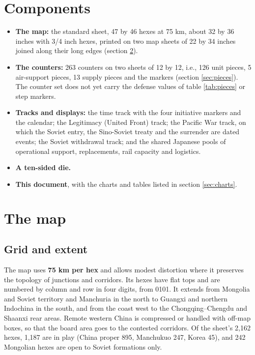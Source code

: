 \documentclass[11pt]{article}
\begin{document}
\section{Components}\label{sec:components}
\begin{itemize}
\item \textbf{The map:} the standard sheet, 47 by 46 hexes at 75 km, about 32 by 36 inches with 3/4 inch hexes, printed on two map sheets of 22 by 34 inches joined along their long edges (section \ref{sec:map}).
\item \textbf{The counters:} 263 counters on two sheets of 12 by 12, i.e., 126 unit pieces, 5 air-support pieces, 13 supply pieces and the markers (section \ref{sec:pieces}). The counter set does not yet carry the defense values of table \ref{tab:pieces} or step markers.
\item \textbf{Tracks and displays:} the time track with the four initiative markers and the calendar; the Legitimacy (United Front) track; the Pacific War track, on which the Soviet entry, the Sino-Soviet treaty and the surrender are dated events; the Soviet withdrawal track; and the shared Japanese pools of operational support, replacements, rail capacity and logistics.\item \textbf{A ten-sided die.}
\item \textbf{This document}, with the charts and tables listed in section \ref{sec:charts}.
\end{itemize}

\section{The map}\label{sec:map}
\subsection{Grid and extent}
The map uses \textbf{75 km per hex} and allows modest distortion where it preserves the topology of junctions and corridors. Its hexes have flat tops and are numbered by column and row in four digits, from 0101. It extends from Mongolia and Soviet territory and Manchuria in the north to Guangxi and northern Indochina in the south, and from the coast west to the Chongqing--Chengdu and Shaanxi rear areas. Remote western China is compressed or handled with off-map boxes, so that the board area goes to the contested corridors. Of the sheet's 2,162 hexes, 1,187 are in play (China proper 895, Manchukuo 247, Korea 45), and 242 Mongolian hexes are open to Soviet formations only.
\end{document}
